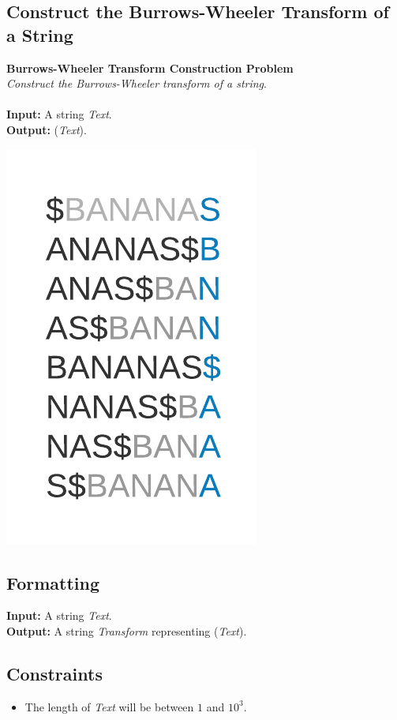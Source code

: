 \documentclass{article}
\renewcommand{\sc}[1]{\text{\scshape #1}}
\begin{document}
\subsection{Construct the Burrows-Wheeler Transform of a String}
\hline\vspace{5}
\textbf{Burrows-Wheeler Transform Construction Problem}\\
\emph{Construct the Burrows-Wheeler transform of a string}.\\ \\
\textbf{Input:} A string \emph{Text}.\\
\textbf{Output:} \sc{BWT}(\emph{Text}).
\begin{center}
    \includegraphics[scale=0.2]{c9/logos/9I.png} 
\end{center}
\hline\vspace{5}

\subsection*{Formatting}
\textbf{Input:} A string \emph{Text}.\\
\noindent\textbf{Output:} A string \emph{Transform} representing \sc{BWT}(\emph{Text}).

\subsection*{Constraints}
\begin{itemize}
    \item The length of \emph{Text} will be between $1$ and $10^3$.
\end{itemize}
\pagebreak
\end{document}

